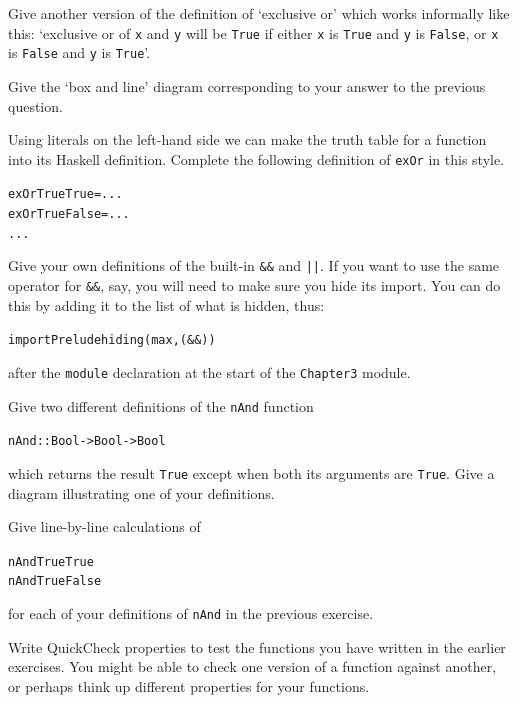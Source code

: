\begin{exercises}
\item
Give another version of the definition of `exclusive or' which
works informally
like this: `exclusive or of \texttt{x} and \texttt{y} will be \texttt{True} if either
\texttt{x} is \texttt{True} and \texttt{y} is \texttt{False}, or \texttt{x} is \texttt{False} and \texttt{y} is \texttt{True}'.

\item Give the `box and line' diagram corresponding to your answer to the 
previous question.

\item Using literals on the left-hand side we can make the truth table
for a function into its Haskell definition. Complete the following
definition of \texttt{exOr} in this style.
\begin{alltt}
exOr True True  = ...
exOr True False = ...
  ...
\end{alltt}

\item Give your own definitions of the built-in \texttt{\&\&} and \texttt{||}. If you want to use the same operator for \texttt{\&\&}, say, you will need to make sure you hide its import. You can do this by adding it to the list of what is hidden, thus:
\begin{alltt}
import Prelude hiding (max,(&&))
\end{alltt}
after the \texttt{module} declaration at the start of the \texttt{Chapter3} module.

\item Give two different definitions of the \texttt{nAnd} function 
\begin{alltt}
nAnd :: Bool -> Bool -> Bool
\end{alltt}
which returns the result \texttt{True} except when both its arguments
are \texttt{True}. Give a diagram illustrating one of your definitions.

\item
Give line-by-line calculations of 
\begin{alltt}
nAnd True True
nAnd True False
\end{alltt}
for each of your definitions of \texttt{nAnd} in the previous exercise.


\item
Write QuickCheck properties to test the functions you have written in the earlier exercises. You might be able to check one version of a function against another, or perhaps think up different properties for your functions.

\end{exercises}



